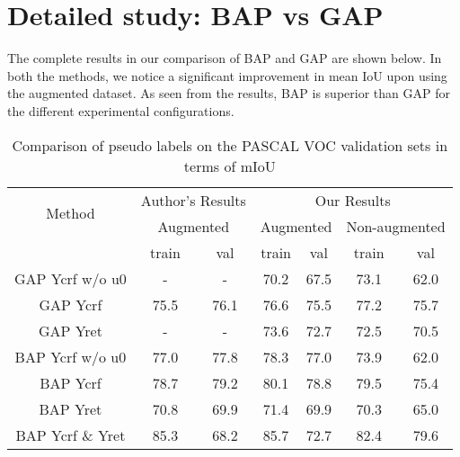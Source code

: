 \vspace{10mm}

\section{Detailed study: BAP vs GAP}
The complete results in our comparison of BAP and GAP are shown below. In both the methods, we notice a significant improvement in mean IoU upon using the augmented dataset. As seen from the results, BAP is  superior than GAP for the different experimental configurations.

\vspace{5mm}
\begin{table}[h!]
\centering
\begin{tabular}{ccccccc}
\toprule\toprule
\multirow{2}{*}{Method} & \multicolumn{2}{c}{Author's Results} & \multicolumn{4}{c}{Our Results}                                   \\
                        & \multicolumn{2}{c}{Augmented}        & \multicolumn{2}{c}{Augmented} & \multicolumn{2}{c}{Non-augmented} \\
                        & train             & val              & train          & val          & train            & val            \\ \midrule
GAP Ycrf w/o u0         & -                 & -                & 70.2           & 67.5         & 73.1             & 62.0             \\
GAP Ycrf                & 75.5              & 76.1             & 76.6           & 75.5         & 77.2             & 75.7           \\
GAP Yret                & -                 & -                & 73.6           & 72.7         & 72.5             & 70.5           \\ \midrule
BAP Ycrf w/o u0         & 77.0                & 77.8             & 78.3           & 77.0           & 73.9             & 62.0             \\
BAP Ycrf                & 78.7              & 79.2             & 80.1           & 78.8         & 79.5             & 75.4           \\
BAP Yret                & 70.8              & 69.9             & 71.4           & 69.9         & 70.3             & 65.0             \\
BAP Ycrf \& Yret        & 85.3              & 68.2             & 85.7           & 72.7         & 82.4             & 79.6           \\ \bottomrule
\end{tabular}
\vspace{1.2mm}
\caption{Comparison of pseudo labels on the PASCAL VOC validation sets in terms of mIoU}
\label{tab:my-table2}
\end{table}